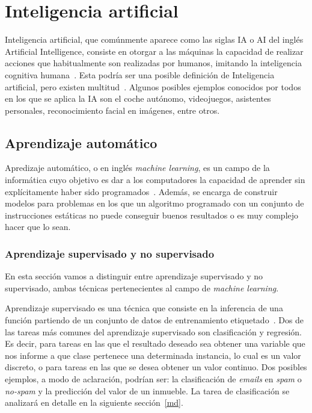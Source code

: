 \section{Inteligencia artificial}

Inteligencia artificial, que comúnmente aparece como las siglas IA o AI del inglés Artificial Intelligence, consiste en otorgar a las máquinas la capacidad de realizar acciones que habitualmente son realizadas por humanos, imitando la inteligencia cognitiva humana~\cite{alanturing:ai}. Esta podría ser una posible definición de Inteligencia artificial, pero existen multitud~\cite{russell1995modern}. Algunos posibles ejemplos conocidos por todos en los que se aplica la IA son el coche autónomo, videojuegos, asistentes personales, reconocimiento facial en imágenes, entre otros.

\subsection{Aprendizaje automático}

Apredizaje automático, o en inglés \textit{machine learning}, es un campo de la informática cuyo objetivo es dar a los computadores la capacidad de aprender sin explícitamente haber sido programados~\cite{wiki:machinelearning}. Además, se encarga de construir modelos para problemas en los que un algoritmo programado con un conjunto de instrucciones estáticas no puede conseguir buenos resultados o es muy complejo hacer que lo sean.



\subsubsection{Aprendizaje supervisado y no supervisado}

En esta sección vamos a distinguir entre aprendizaje supervisado y no supervisado, ambas técnicas pertenecientes al campo de \textit{machine learning}.

Aprendizaje supervisado es una técnica que consiste en la inferencia de una función partiendo de un conjunto de datos de entrenamiento etiquetado~\cite{wiki:supervisedLearning}. Dos de las tareas más comunes del aprendizaje supervisado son clasificación y regresión. Es decir, para tareas en las que el resultado deseado sea obtener una variable que nos informe a que clase pertenece una determinada instancia, lo cual es un valor discreto, o para tareas en las que se desea obtener un valor continuo. Dos posibles ejemplos, a modo de aclaración,  podrían ser: la clasificación de \textit{emails} en \textit{spam} o \textit{no-spam} y la predicción del valor de un inmueble. La tarea de clasificación se analizará en detalle en la siguiente sección~\ref{md}.

